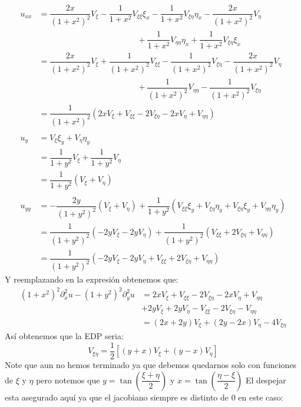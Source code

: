 \begin{homeworkProblem}
\begin{itemize}
\begin{solucion}
\begin{align*}
                \\
                u_{xx}&=\dfrac{2x}{(1+x^2)^2}V_\xi-\dfrac{1}{1+x^2}V_{\xi\xi}\xi_x-\dfrac{1}{1+x^2}V_{\xi\eta}\eta_x-\dfrac{2x}{(1+x^2)^2}V_\eta\\
                &\hspace{5cm}+\dfrac{1}{1+x^2}V_{\eta\eta}\eta_x+\dfrac{1}{1+x^2}V_{\xi\eta}\xi_x\\
                &=\dfrac{2x}{(1+x^2)^2}V_\xi+\dfrac{1}{(1+x^2)^2}V_{\xi\xi}-\dfrac{1}{(1+x^2)^2}V_{\xi\eta}-\dfrac{2x}{(1+x^2)^2}V_\eta\\
                &\hspace{5cm}+\dfrac{1}{(1+x^2)^2}V_{\eta\eta}-\dfrac{1}{(1+x^2)^2}V_{\xi\eta}\\
                &=\dfrac{1}{(1+x^2)^2}(2xV_\xi+V_{\xi\xi}-2V_{\xi\eta}-2xV_\eta+V_{\eta\eta})\\
                \\
                u_y&=V_\xi \xi_y+V_\eta \eta_y\\
                &=\dfrac{1}{1+y^2}V_\xi+\dfrac{1}{1+y^2}V_\eta\\
                &=\dfrac{1}{1+y^2}(V_\xi+V_\eta)\\
                \\
                u_{yy}&=-\dfrac{2y}{(1+y^2)^2}(V_\xi+V_\eta)+\dfrac{1}{1+y^2}(V_{\xi\xi}\xi_y+V_{\xi\eta}\eta_y+V_{\xi\eta}\xi_y+V_{\eta\eta}\eta_y)\\
                &=\dfrac{1}{(1+y^2)^2}(-2yV_\xi-2yV_\eta)+\dfrac{1}{(1+y^2)^2}(V_{\xi\xi}+2V_{\xi\eta}+V_{\eta\eta})\\
                &=\dfrac{1}{(1+y^2)^2}(-2yV_\xi-2yV_\eta+V_{\xi\xi}+2V_{\xi\eta}+V_{\eta\eta})
            \end{align*}
            Y reemplazando en la expresión obtenemos que:
            \begin{align*}
                (1+x^2)^2\partial^2_xu-(1+y^2)^2\partial^2_yu&=2xV_\xi+V_{\xi\xi}-2V_{\xi\eta}-2xV_\eta+V_{\eta\eta}\\&+2yV_\xi+2yV_\eta-V_{\xi\xi}-2V_{\xi\eta}-V_{\eta\eta}\\
                &=(2x+2y)V_\xi+(2y-2x)V_\eta-4V_{\xi\eta}
            \end{align*}
            Así obtenemos que la EDP seria:
            $$V_{\xi\eta}=\dfrac{1}{2}[(y+x)V_\xi+(y-x)V_\eta]$$
            Note que aun no hemos terminado ya que debemos quedarnos solo con funciones de $\xi$ y $\eta$ pero notemos que $y=\tan\left(\dfrac{\xi+\eta}{2}\right)$ y $x=\tan\left(\dfrac{\eta-\xi}{2}\right)$ El despejar esta asegurado aquí ya que el jacobiano siempre es distinto de 0 en este caso:

\end{solucion}
\end{itemize}
\end{homeworkProblem}
